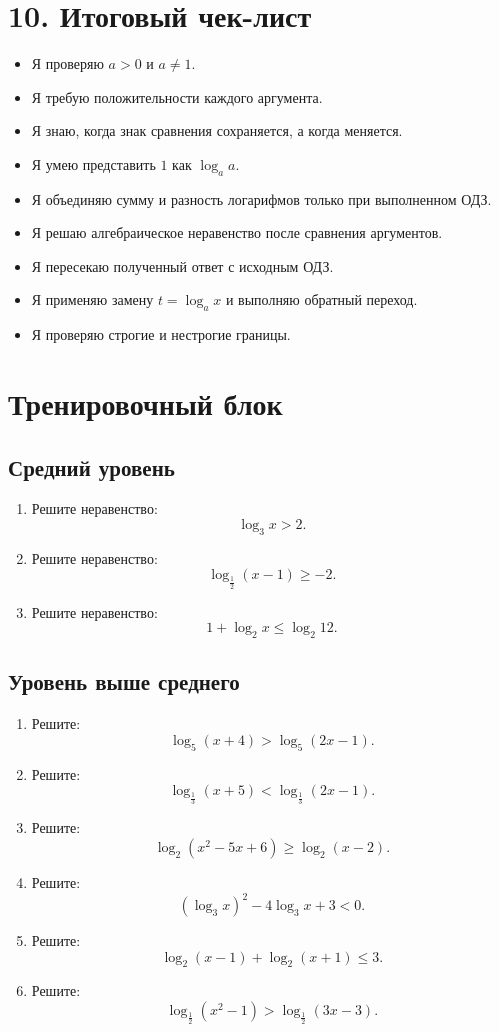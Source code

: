 \documentclass[a4paper,12pt]{article}
\begin{document}
\section*{10. Итоговый чек-лист}
\begin{itemize}[label=$\square$]
\item Я проверяю $a>0$ и $a\ne1$.
\item Я требую положительности каждого аргумента.
\item Я знаю, когда знак сравнения сохраняется, а когда меняется.
\item Я умею представить $1$ как $\log_a a$.
\item Я объединяю сумму и разность логарифмов только при выполненном ОДЗ.
\item Я решаю алгебраическое неравенство после сравнения аргументов.
\item Я пересекаю полученный ответ с исходным ОДЗ.
\item Я применяю замену $t=\log_a x$ и выполняю обратный переход.
\item Я проверяю строгие и нестрогие границы.
\end{itemize}

\clearpage
\section*{Тренировочный блок}

\subsection*{Средний уровень}
\begin{enumerate}
\item Решите неравенство:
\[
\log_3 x>2.
\]

\item Решите неравенство:
\[
\log_{\frac12}(x-1)\ge-2.
\]

\item Решите неравенство:
\[
1+\log_2x\le\log_2 12.
\]
\end{enumerate}

\subsection*{Уровень выше среднего}
\begin{enumerate}[resume]
\item Решите:
\[
\log_5(x+4)>\log_5(2x-1).
\]

\item Решите:
\[
\log_{\frac13}(x+5)<\log_{\frac13}(2x-1).
\]

\item Решите:
\[
\log_2(x^2-5x+6)\ge\log_2(x-2).
\]

\item Решите:
\[
(\log_3x)^2-4\log_3x+3<0.
\]

\item Решите:
\[
\log_2(x-1)+\log_2(x+1)\le3.
\]

\item Решите:
\[
\log_{\frac12}(x^2-1)>\log_{\frac12}(3x-3).
\]
\end{enumerate}
\end{document}
